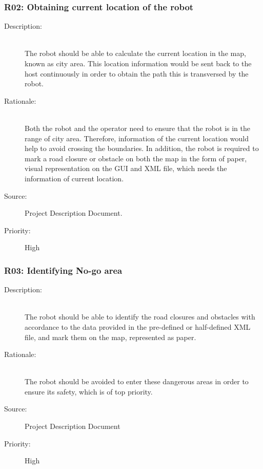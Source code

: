 \documentclass[titlepage]{article}
\begin{document}
\subsubsection{R02: Obtaining current location of the robot }
\begin{description}
\item[Description: ] \hfill \\The robot should be able to calculate the current location in the map, known as city area. This location information would be sent back to the host continuously in order to obtain the path this is transversed by the robot.

\item[Rationale: ] \hfill \\Both the robot and the operator need to ensure that the robot is in the range of city area. Therefore, information of the current location would help to avoid crossing the boundaries. In addition, the robot is required to mark a road closure or obstacle on both the map in the form of paper, visual representation on the GUI and XML file, which needs the information of current location.
\item[Source: ] Project Description Document.
\item[Priority: ] High
\end{description}


\subsubsection{R03: Identifying No-go area}
\begin{description}
\item[Description: ] \hfill \\ The robot should be able to identify the road closures and obstacles with accordance to the data provided in the pre-defined or half-defined XML file, and mark them on the map, represented as paper.
\item[Rationale: ] \hfill \\The robot should be avoided to enter these dangerous areas in order to ensure its safety, which is of top priority.
\item[Source: ] Project Description Document 
\item[Priority: ] High
\end{description}
\end{document}
